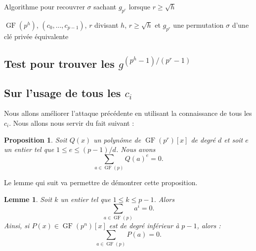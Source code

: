 \documentclass[a4paper, titlepage]{article}
\newtheorem{lemm}[theo]{Lemme}
\newtheorem{prop}[theo]{Proposition}
\theoremstyle{definition}
\theoremstyle{remark}
\def\gf{\operatorname{GF}}
\begin{document}
\begin{algorithm}[h]
\caption{Algorithme pour recouvrer $\sigma$ sachant $g_{p^r}$ lorsque $r\geqslant \sqrt h$}
\label{algogpr}
\begin{algorithmic}[1]
\REQUIRE $\gf(p^h)$, $(c_0,\dots, c_{p-1})$, $r$ divisant $h$, $r\geqslant \sqrt h$ et $g_{p^r}$
\ENSURE une permutation $\sigma$ d'une clé privée équivalente
\FORALL{$u$ dans $\gf(p)$} 
		
	\ENDFOR
		\RETURN{$\sigma$}
	\ENDIF
\ENDFOR
\end{algorithmic}
\end{algorithm}

\subsection{Test pour trouver les $g^{(p^h-1)/(p^r-1)}$}

\subsection{Sur l'usage de tous les $c_i$}

Nous allons améliorer l'attaque précédente en utilisant la connaissance de tous les $c_i$. Nous allons nous servir du fait suivant :

\begin{prop}
Soit $Q(x)$ un polynôme de $\gf(p^r)[x]$ de degré $d$ et soit $e$ un entier tel que $1 \leqslant e \leqslant (p-1)/d$. Nous avons $$\sum_{a \in \gf(p)} Q(a)^e = 0.$$
\end{prop}

Le lemme qui suit va permettre de démontrer cette proposition.

\begin{lemm}
Soit $k$ un entier tel que $1 \leqslant k \leqslant p-1$. Alors
$$\sum_{a\in\gf(p)} a^i = 0.$$
Ainsi, si $P(x) \in \gf(p^n)[x]$ est de degré inférieur à $p-1$, alors : $$\sum_{a\in\gf(p)} P(a) = 0.$$
\end{lemm}
\end{document}
